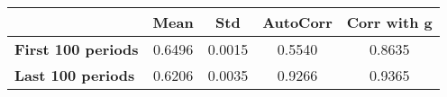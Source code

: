 \begin{tiny}\begin{tabular}{|l|c|c|c|c|}
\hline
&\textbf{Mean}&\textbf{Std}&\textbf{AutoCorr}&\textbf{Corr with g}\\\hline
\textbf{First 100 periods}&0.6496&0.0015&0.5540&0.8635\\\hline
\textbf{Last 100 periods}&0.6206&0.0035&0.9266&0.9365\\\hline
\end{tabular}
\end{tiny}
